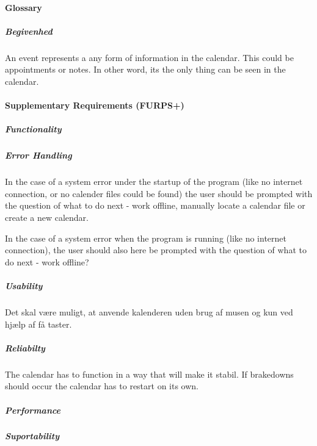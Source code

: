 \documentclass{article}
\begin{document}
	   \mbox{}
	
   \paragraph{Glossary} \mbox{}
\subparagraph{Begivenhed} \mbox{}

An event represents a any form of information in the calendar. This could be appointments or notes. In other word, its the only thing can be seen in the calendar. \\
   
   \paragraph{Supplementary Requirements (FURPS+)} \mbox{}
   \subparagraph{Functionality} \mbox{}
   
   \subparagraph{Error Handling} \mbox{}
   
   In the case of a system error under the startup of the program (like no internet connection, or no calender files could be found) the user should be prompted with the question of what to do next - work offline, manually locate a calendar file or create a new calendar. \linebreak
   
   In the case of a system error when the program is running (like no internet connection), the user should also here be prompted with the question of what to do next - work offline?
   \subparagraph{Usability} \mbox{}
   
   Det skal være muligt, at anvende kalenderen uden brug af musen og kun ved hjælp af få taster.
   \subparagraph{Reliabilty} \mbox{}
   
   The calendar has to function in a way that will make it stabil. If brakedowns should occur the calendar has to restart on its own. 
   
   \subparagraph{Performance} \mbox{}
   
   
   \subparagraph{Suportability} \mbox{}
   
   
   
   
  
\end{document}
